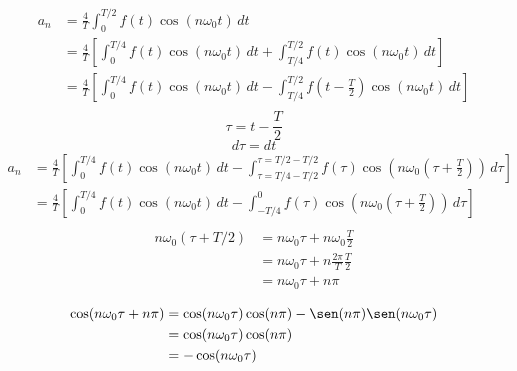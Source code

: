 \begin{equation*}
\begin{split}
    a_n
        &=\frac{4}{T}\int_0^{T/2} f(t)\cos(n\omega_0 t)\,dt\\
        &=\frac{4}{T}\left[
            \int_0^{T/4} f(t)\cos(n\omega_0 t)\,dt+
            \int_{T/4}^{T/2} f(t)\cos(n\omega_0 t)\,dt
        \right]\\
        &=\frac{4}{T}\left[
            \int_0^{T/4} f(t)\cos(n\omega_0 t)\,dt-
            \int_{T/4}^{T/2} f(t-\frac{T}{2})\cos(n\omega_0 t)\,dt
        \right]\\
\end{split}
\end{equation*}
\begin{equation*}
    \tau=t-\frac{T}{2}
\end{equation*}
\begin{equation*}
    d\tau=dt
\end{equation*}
\begin{equation*}
\begin{split}
    a_n
        &=\frac{4}{T}\left[
            \int_0^{T/4} f(t)\cos(n\omega_0 t)\,dt-
            \int_{\tau=T/4-T/2}^{\tau=T/2-T/2}
                f(\tau)\cos(n\omega_0(\tau+\frac{T}{2}))\,d\tau
        \right]\\
        &=\frac{4}{T}\left[
            \int_0^{T/4} f(t)\cos(n\omega_0 t)\,dt-
            \int_{-T/4}^{0} f(\tau)\cos(n\omega_0(\tau+\frac{T}{2}))\,d\tau
        \right]\\
\end{split}
\end{equation*}
\begin{equation*}
\begin{split}
    n\omega_0(\tau+T/2)
        &=n\omega_0\tau+n\omega_0\frac{T}{2}\\
        &=n\omega_0\tau+n\frac{2\pi}{T}\frac{T}{2}\\
        &=n\omega_0\tau+n\pi\\
\end{split}
\end{equation*}
\begin{equation*}
\begin{split}
    \cos(n\omega_0\tau+n\pi)
        &=\cos(n\omega_0\tau)\cos(n\pi)-\sen(n\pi)\sen(n\omega_0\tau)\\
        &=\cos(n\omega_0\tau)\cos(n\pi)\\
        &=-\cos(n\omega_0\tau)\\
\end{split}
\end{equation*}
